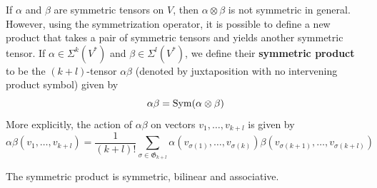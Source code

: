 If $\alpha$ and $\beta$ are symmetric tensors on $V$, then $\alpha\otimes\beta$ is not symmetric in general. However, using the symmetrization operator, it is possible to define a new product that takes a pair of symmetric tensors and yields another symmetric tensor. If $\alpha\in\Sigma^k(V^*)$ and $\beta\in\Sigma^l(V^*)$, we define their \textbf{symmetric product} to be the $(k+l)$-tensor $\alpha\beta$ (denoted by juxtaposition with no intervening product symbol) given by
\[\alpha\beta=\mathrm{Sym}(\alpha\otimes\beta)\]
More explicitly, the action of $\alpha\beta$ on vectors $v_1,\dots,v_{k+l}$ is given by
\[\alpha\beta(v_1,\dots,v_{k+l})=\frac{1}{(k+l)!}\sum_{\sigma\in\mathfrak{G}_{k+l}}\alpha(v_{\sigma(1)},\dots,v_{\sigma(k)})\beta(v_{\sigma(k+1)},\dots,v_{\sigma(k+l)})\]
\begin{proposition}
The symmetric product is symmetric, bilinear and associative.
\end{proposition}
